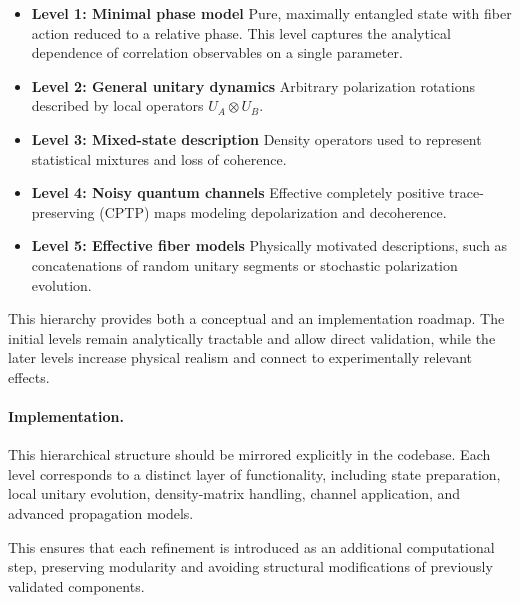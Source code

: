 \documentclass[a4paper]{article}
\begin{document}
\begin{itemize}

\item \textbf{Level 1: Minimal phase model}  
Pure, maximally entangled state with fiber action reduced to a relative phase. This level captures the analytical dependence of correlation observables on a single parameter.

\item \textbf{Level 2: General unitary dynamics}  
Arbitrary polarization rotations described by local operators \( U_A \otimes U_B \).

\item \textbf{Level 3: Mixed-state description}  
Density operators used to represent statistical mixtures and loss of coherence.

\item \textbf{Level 4: Noisy quantum channels}  
Effective completely positive trace-preserving (CPTP) maps modeling depolarization and decoherence.

\item \textbf{Level 5: Effective fiber models}  
Physically motivated descriptions, such as concatenations of random unitary segments or stochastic polarization evolution.

\end{itemize}

\medskip

This hierarchy provides both a conceptual and an implementation roadmap. The initial levels remain analytically tractable and allow direct validation, while the later levels increase physical realism and connect to experimentally relevant effects.

\medskip

\paragraph{Implementation.}

This hierarchical structure should be mirrored explicitly in the codebase. Each level corresponds to a distinct layer of functionality, including state preparation, local unitary evolution, density-matrix handling, channel application, and advanced propagation models.

This ensures that each refinement is introduced as an additional computational step, preserving modularity and avoiding structural modifications of previously validated components.

\end{document}
